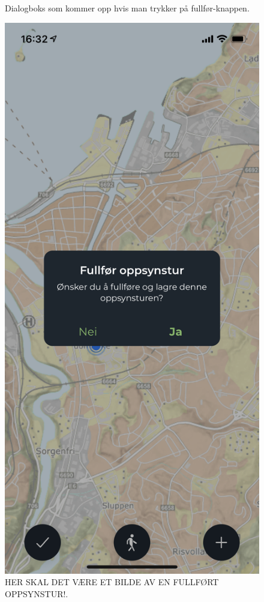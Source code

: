 \begin{figure}[H]
\begin{minipage}[b]{0.4\textwidth}
    \caption{Dialogboks som kommer opp hvis man trykker på fullfør-knappen.}
    \label{fig:follfore-oppsynstur}
  \end{minipage}
  \hfill
  \begin{minipage}[b]{0.4\textwidth}
    \centering
    \includegraphics[scale=0.4]{Figurer/skjermbilder/follfore-oppsynstur.png}
    \caption{HER SKAL DET VÆRE ET BILDE AV EN FULLFØRT OPPSYNSTUR!.}
    \label{fig:oppsynstur-oppsummering}
  \end{minipage}
\end{figure}


